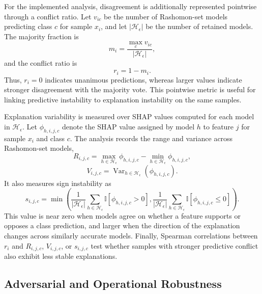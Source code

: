 For the implemented analysis, disagreement is additionally represented pointwise through a conflict ratio. Let $v_{ic}$ be the number of Rashomon-set models predicting class $c$ for sample $x_i$, and let $|\mathcal{H}_{\epsilon}|$ be the number of retained models. The majority fraction is
\begin{equation*}
    m_i = \frac{\max_c v_{ic}}{|\mathcal{H}_{\epsilon}|},
\end{equation*}
and the conflict ratio is
\begin{equation*}
    r_i = 1 - m_i .
\end{equation*}
Thus, $r_i=0$ indicates unanimous predictions, whereas larger values indicate stronger disagreement with the majority vote. This pointwise metric is useful for linking predictive instability to explanation instability on the same samples.

Explanation variability is measured over \gls{SHAP} values computed for each model in $\mathcal{H}_{\epsilon}$. Let $\phi_{h,i,j,c}$ denote the \gls{SHAP} value assigned by model $h$ to feature $j$ for sample $x_i$ and class $c$. The analysis records the range and variance across Rashomon-set models,
\begin{equation*}
    R_{i,j,c} =
    \max_{h \in \mathcal{H}_{\epsilon}} \phi_{h,i,j,c}
    -
    \min_{h \in \mathcal{H}_{\epsilon}} \phi_{h,i,j,c},
\end{equation*}
\begin{equation*}
    V_{i,j,c} =
    \operatorname{Var}_{h \in \mathcal{H}_{\epsilon}}
    \left(\phi_{h,i,j,c}\right).
\end{equation*}
It also measures sign instability as
\begin{equation*}
    s_{i,j,c} =
    \min\left(
        \frac{1}{|\mathcal{H}_{\epsilon}|}\sum_{h \in \mathcal{H}_{\epsilon}}\mathbb{I}[\phi_{h,i,j,c} > 0],
        \frac{1}{|\mathcal{H}_{\epsilon}|}\sum_{h \in \mathcal{H}_{\epsilon}}\mathbb{I}[\phi_{h,i,j,c} \leq 0]
    \right).
\end{equation*}
This value is near zero when models agree on whether a feature supports or opposes a class prediction, and larger when the direction of the explanation changes across similarly accurate models. Finally, Spearman correlations between $r_i$ and $R_{i,j,c}$, $V_{i,j,c}$, or $s_{i,j,c}$ test whether samples with stronger predictive conflict also exhibit less stable explanations.

\subsection{Adversarial and Operational Robustness}


